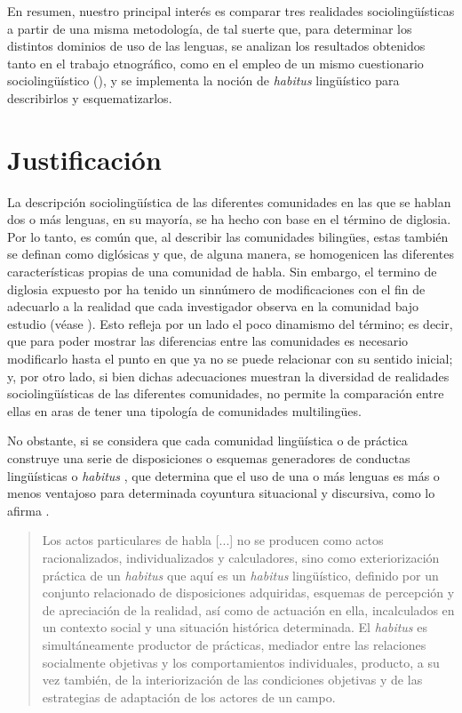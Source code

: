 \documentclass[output=paper]{../langscibook}
\begin{document}
En resumen, nuestro principal interés es comparar tres realidades sociolingüísticas a partir de una misma metodología, de tal suerte que, para determinar los distintos dominios de uso de las lenguas, se analizan los resultados obtenidos tanto en el trabajo etnográfico, como en el empleo de un mismo cuestionario sociolingüístico (\citealt{GuerreroGalván2009ms}), y se implementa la noción de \textit{habitus} lingüístico para describirlos y esquematizarlos.


 \section{Justificación}


La descripción sociolingüística de las diferentes comunidades en las que se hablan dos o más lenguas, en su mayoría, se ha hecho con base en el término de diglosia. Por lo tanto, es común que, al describir las comunidades bilingües, estas también se definan como diglósicas y que, de alguna manera, se homogenicen las diferentes características propias de una comunidad de habla. Sin embargo, el termino de diglosia expuesto por \citet{Ferguson1959} ha tenido un sinnúmero de modificaciones con el fin de adecuarlo a la realidad que cada investigador observa en la comunidad bajo estudio (véase \citealt{Zimmermann2010}). Esto refleja por un lado el poco dinamismo del término; es decir, que para poder mostrar las diferencias entre las comunidades es necesario modificarlo hasta el punto en que ya no se puede relacionar con su sentido inicial; y, por otro lado, si bien dichas adecuaciones muestran la diversidad de realidades sociolingüísticas de las diferentes comunidades, no permite la comparación entre ellas en aras de tener una tipología de comunidades multilingües.

  No obstante, si se considera que cada comunidad lingüística o de práctica construye una serie de disposiciones o esquemas generadores de conductas lingüísticas o \textit{habitus} \citep[114]{Bourdieu1990}, que determina que el uso de una o más lenguas es más o menos ventajoso para determinada coyuntura situacional y discursiva, como lo afirma  \citet[6, 221]{AlonsoBenito2004}.

\begin{quote}
Los actos particulares de habla [...] no se producen como actos racionalizados, individualizados y calculadores, sino como exteriorización práctica de un \textit{habitus} que aquí es un \textit{habitus} lingüístico, definido por un conjunto relacionado de disposiciones adquiridas, esquemas de percepción y de apreciación de la realidad, así como de actuación en ella, incalculados en un contexto social y una situación histórica determinada. El \textit{habitus} es simultáneamente productor de prácticas, mediador entre las relaciones socialmente objetivas y los comportamientos individuales, producto, a su vez también, de la interiorización de las condiciones objetivas y de las estrategias de adaptación de los actores de un campo.
\end{quote}
\end{document}
